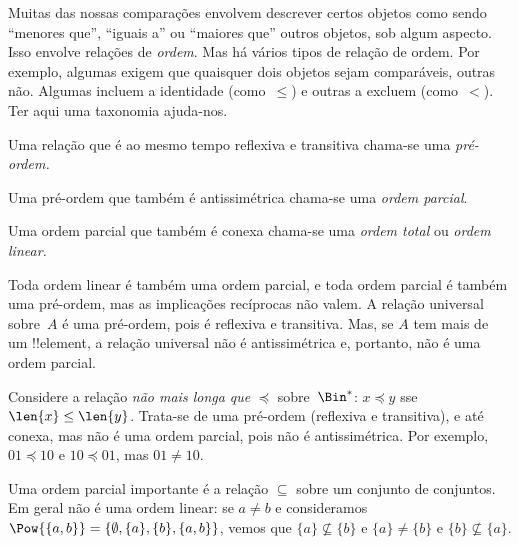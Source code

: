 \documentclass[../../../include/open-logic-section]{subfiles}
\begin{document}

\begin{explain}
Muitas das nossas comparações envolvem descrever certos objetos como
sendo ``menores que'', ``iguais a'' ou ``maiores que'' outros objetos,
sob algum aspecto. Isso envolve relações de \emph{ordem}. Mas há
vários tipos de relação de ordem. Por exemplo, algumas exigem que
quaisquer dois objetos sejam comparáveis, outras não. Algumas incluem a
identidade (como~$\le$) e outras a excluem (como~$<$). Ter aqui uma
taxonomia ajuda-nos.
\end{explain}

\begin{defn}
Uma relação que é ao mesmo tempo reflexiva e transitiva chama-se uma
\emph{pré-ordem.}
\end{defn}

\begin{defn}
Uma pré-ordem que também é antissimétrica chama-se uma
\emph{ordem parcial}.
\end{defn}

\begin{defn}
Uma ordem parcial que também é conexa chama-se uma
\emph{ordem total} ou \emph{ordem linear.}
\end{defn}

\begin{ex}
Toda ordem linear é também uma ordem parcial, e toda ordem parcial é
também uma pré-ordem, mas as implicações recíprocas não valem. A relação
universal sobre~$A$ é uma pré-ordem, pois é reflexiva e transitiva. Mas,
se $A$ tem mais de um !!{element}, a relação universal não é
antissimétrica e, portanto, não é uma ordem parcial.
\end{ex}

\begin{ex}
Considere a relação \emph{não mais longa que} $\preccurlyeq$
sobre~$\Bin^*$: $x \preccurlyeq y$ sse $\len{x} \le \len{y}$. Trata-se de
uma pré-ordem (reflexiva e transitiva), e até conexa, mas não é uma
ordem parcial, pois não é antissimétrica. Por exemplo, $01
\preccurlyeq 10$ e $10 \preccurlyeq 01$, mas $01 \neq 10$.
\end{ex}

\begin{ex}
Uma ordem parcial importante é a relação $\subseteq$ sobre um conjunto de
conjuntos. Em geral não é uma ordem linear: se $a \neq b$ e
consideramos $\Pow{\{a, b\}} = \{\emptyset, \{a\}, \{b\}, \{a,b\}\}$,
vemos que $\{a\} \nsubseteq \{b\}$ e $\{a\} \neq \{b\}$ e $\{b\}
\nsubseteq \{a\}$.
\end{ex}
\end{document}
